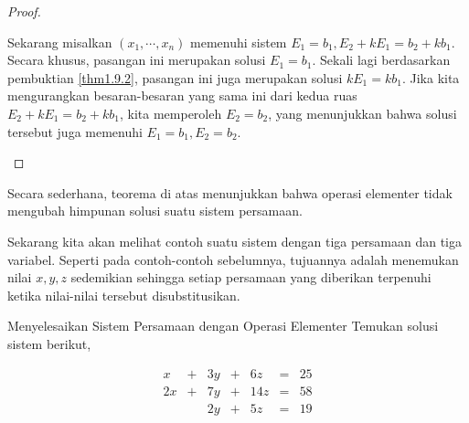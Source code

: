 \begin{proof}
\begin{enumerate}
Sekarang misalkan $\left( x_{1},\cdots ,x_{n}\right)$ memenuhi sistem
$E_{1}=b_{1}, E_{2}+kE_{1}=b_{2}+kb_{1}$. Secara khusus, pasangan ini merupakan solusi $E_{1} = b_{1}$. Sekali lagi berdasarkan pembuktian \ref{thm1.9.2},
 pasangan ini juga merupakan solusi $kE_{1}=kb_{1}$. Jika kita mengurangkan besaran-besaran yang sama ini dari kedua ruas
$E_{2}+kE_{1}=b_{2}+kb_{1}$, kita memperoleh $E_{2}=b_{2}$, yang menunjukkan bahwa solusi tersebut juga memenuhi
$E_{1}=b_{1},E_{2}=b_{2}.$
\end{enumerate}
\end{proof}
\fi
Secara sederhana, teorema di atas menunjukkan bahwa operasi elementer tidak
mengubah himpunan solusi suatu sistem persamaan.

Sekarang kita akan melihat contoh suatu sistem dengan tiga persamaan dan tiga variabel.
Seperti pada contoh-contoh sebelumnya, tujuannya adalah menemukan nilai $x,y,z$ sedemikian sehingga setiap persamaan yang diberikan
terpenuhi ketika nilai-nilai tersebut disubstitusikan.

\begin{example}{ Menyelesaikan Sistem Persamaan dengan Operasi Elementer}\label{exa:solvingasystemwithelementaryops}
Temukan solusi sistem berikut,

\begin{equation}
\begin{array}{ccccccc}
x&+&3y&+&6z&=&25 \\
2x&+&7y&+&14z&=&58 \\
&&2y&+&5z&=&19
\end{array}
\label{solvingasystem1}
\end{equation}
\end{example}

